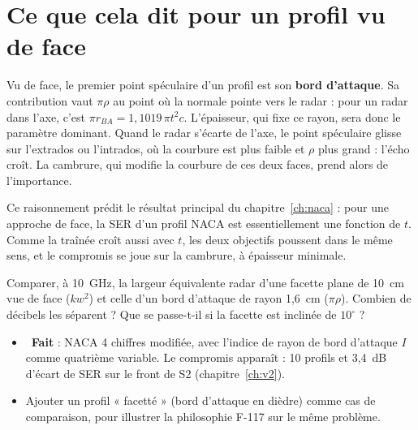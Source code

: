 \section{Ce que cela dit pour un profil vu de face}
Vu de face, le premier point spéculaire d'un profil est son \textbf{bord d'attaque}. Sa contribution vaut $\pi\rho$ au point où la normale pointe vers le radar : pour un radar dans l'axe, c'est $\pi r_{BA}=1{,}1019\,\pi t^2c$. L'épaisseur, qui fixe ce rayon, sera donc le paramètre dominant. Quand le radar s'écarte de l'axe, le point spéculaire glisse sur l'extrados ou l'intrados, où la courbure est plus faible et $\rho$ plus grand : l'écho croît. La cambrure, qui modifie la courbure de ces deux faces, prend alors de l'importance.

\begin{projet}
Ce raisonnement prédit le résultat principal du chapitre~\ref{ch:naca} : pour une approche de face, la SER d'un profil NACA est essentiellement une fonction de $t$. Comme la traînée croît aussi avec $t$, les deux objectifs poussent dans le même sens, et le compromis se joue sur la cambrure, à épaisseur minimale.
\end{projet}

\exercices
\begin{exercice}
Comparer, à 10~GHz, la largeur équivalente radar d'une facette plane de 10~cm vue de face ($kw^2$) et celle d'un bord d'attaque de rayon 1,6~cm ($\pi\rho$). Combien de décibels les séparent ? Que se passe-t-il si la facette est inclinée de $10^\circ$ ?
\end{exercice}

\begin{pistes}
\begin{itemize}
\item {}~\textbf{Fait} : NACA 4 chiffres modifiée, avec l'indice de rayon de bord d'attaque $I$ comme quatrième variable. Le compromis apparaît : 10 profils et 3,4~dB d'écart de SER sur le front de S2 (chapitre~\ref{ch:v2}).
\item Ajouter un profil « facetté » (bord d'attaque en dièdre) comme cas de comparaison, pour illustrer la philosophie F-117 sur le même problème.
\end{itemize}
\end{pistes}
